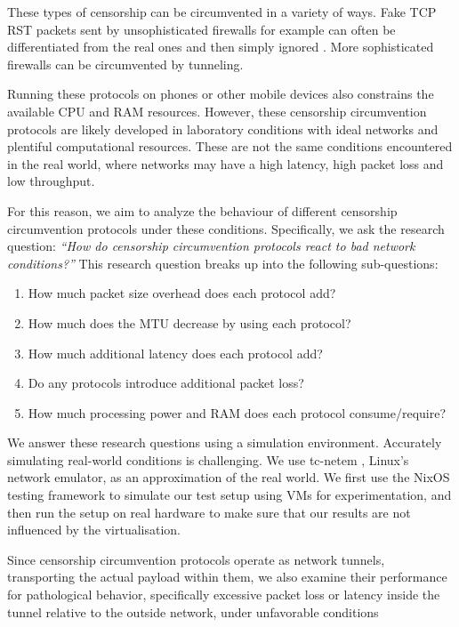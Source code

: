 These types of censorship can be circumvented in a variety of ways.
Fake TCP RST packets sent by unsophisticated firewalls for example can often be differentiated from the real ones and then simply ignored \cite{GoodbyeDPI-passive}.
More sophisticated firewalls can be circumvented by tunneling.

Running these protocols on phones or other mobile devices also constrains the available CPU and RAM resources.
However, these censorship circumvention protocols are likely developed in laboratory conditions with ideal networks and plentiful computational resources.
These are not the same conditions encountered in the real world, where networks may have a high latency, high packet loss and low throughput.

For this reason, we aim to analyze the behaviour of different censorship circumvention protocols under these conditions.
Specifically, we ask the research question:
\emph{``How do censorship circumvention protocols react to bad network conditions?''}
This research question breaks up into the following sub-questions:
\begin{enumerate}
  \item How much packet size overhead does each protocol add?
  \item How much does the MTU decrease by using each protocol?
  \item How much additional latency does each protocol add?
  \item Do any protocols introduce additional packet loss?
  \item How much processing power and RAM does each protocol consume/require?
\end{enumerate}

We answer these research questions using a simulation environment.
Accurately simulating real-world conditions is challenging.
We use tc-netem \cite{man8:tc-netem}, Linux's network emulator, as an approximation of the real world.
We first use the NixOS testing framework to simulate our test setup using VMs for experimentation, and then run the setup on real hardware to make sure that our results are not influenced by the virtualisation.

Since censorship circumvention protocols operate as network tunnels, transporting the actual payload within them, we also examine their performance for pathological behavior, specifically excessive packet loss or latency inside the tunnel relative to the outside network, under unfavorable conditions


